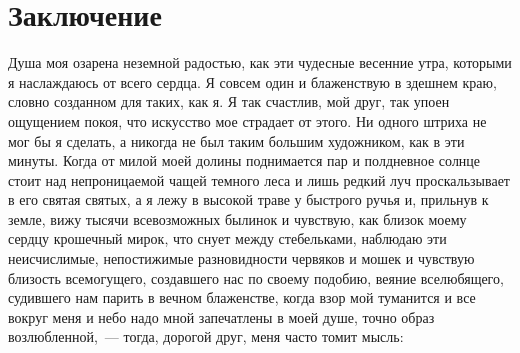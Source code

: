 
\section{Заключение}
\label{sec:conclusion}
Душа моя озарена неземной радостью, как эти чудесные весенние утра, которыми я наслаждаюсь от всего сердца.
Я совсем один и блаженствую в здешнем краю, словно созданном для таких, как я.
Я так счастлив, мой друг, так упоен ощущением покоя, что искусство мое страдает от этого.
Ни одного штриха не мог бы я сделать, а никогда не был таким большим художником, как в эти минуты.
Когда от милой моей долины поднимается пар и полдневное солнце стоит над непроницаемой чащей темного леса и лишь редкий луч проскальзывает в его святая святых, а я лежу в высокой траве у быстрого ручья и, прильнув к земле, вижу тысячи всевозможных былинок и чувствую, как близок моему сердцу крошечный мирок, что снует между стебельками, наблюдаю эти неисчислимые, непостижимые разновидности червяков и мошек и чувствую близость всемогущего, создавшего нас по своему подобию, веяние вселюбящего, судившего нам парить в вечном блаженстве, когда взор мой туманится и все вокруг меня и небо надо мной запечатлены в моей душе, точно образ возлюбленной,~--- тогда, дорогой друг, меня часто томит мысль: \cite{goethe}
